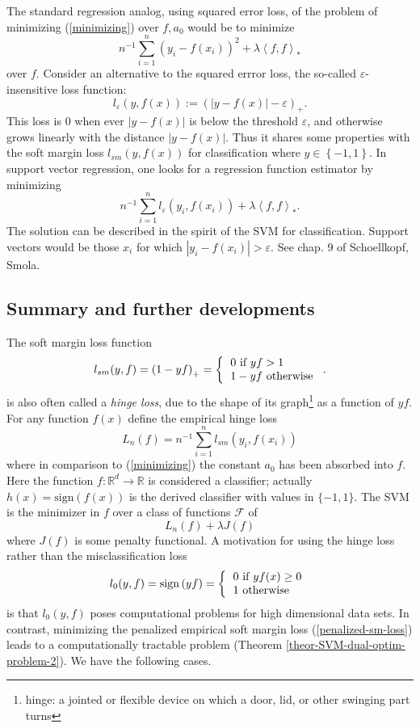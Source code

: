 \documentclass[11pt,twoside]{article}%
\theoremstyle{change}
\begin{document}
The standard regression analog, using squared error loss, of the problem of
minimizing (\ref{minimizing}) over $f,a_{0}$ would be to minimize%
\[
n^{-1}\sum_{i=1}^{n}(y_{i}-f(x_{i}))^{2}+\lambda\left\langle f,f\right\rangle
_{\ast}%
\]
over $f$. Consider an alternative to the squared errror loss, the so-called
$\varepsilon$-insensitive loss function:
\[
l_{\varepsilon}\left(  y,f(x)\right)  :=\left(  \left\vert y-f(x)\right\vert
-\varepsilon\right)  _{+}.
\]
This loss is $0$ when ever $\left\vert y-f(x)\right\vert $ is below the
threshold $\varepsilon$, and otherwise grows linearly with the distance
$\left\vert y-f(x)\right\vert .$ Thus it shares some properties with the soft
margin loss $l_{sm}(y,f(x))$ for classification where $y\in\left\{
-1,1\right\}  $. In support vector regression, one looks for a regression
function estimator by minimizing%
\[
n^{-1}\sum_{i=1}^{n}l_{\varepsilon}\left(  y_{i},f(x_{i})\right)
+\lambda\left\langle f,f\right\rangle _{\ast}.
\]
The solution can be described in the spirit of the SVM for classification.
Support vectors would be those $x_{i}$ for which $\left\vert y_{i}%
-f(x_{i})\right\vert >\varepsilon$. See chap. 9 of Schoellkopf, Smola.

\subsection{Summary and further developments}

The soft margin loss function
\[
l_{sm}(y,f)=\left(  1-yf\right)  _{+}=\left\{
\begin{tabular}
[c]{l}%
$0$ if $yf>1$\\
$1-yf$ otherwise
\end{tabular}
\right.  .
\]
is also often called a \textit{hinge loss}, due to the shape of its
graph\footnote{hinge: a jointed or flexible device on which a door, lid, or
other swinging part turns} as a function of $yf$. For any function $f(x)$
define the empirical hinge loss
\[
L_{n}(f)=n^{-1}\sum_{i=1}^{n}l_{sm}(y_{i},f(x_{i}))
\]
where in comparison to (\ref{minimizing}) the constant $a_{0}$ has been
absorbed into $f$. Here the function $f:\mathbb{R}^{d}\rightarrow\mathbb{R}$
is considered a classifier; actually $h(x)=\mathrm{sign}\left(  f(x)\right)  $
is the derived classifier with values in $\{-1,1\}$. The SVM is the minimizer
in $f$ over a class of functions $\mathcal{F}$ of
\begin{equation}
L_{n}(f)+\lambda J(f)\label{penalized-sm-loss}%
\end{equation}
where $J(f)$ is some penalty functional. A motivation for using the hinge loss
rather than the misclassification loss
\[
l_{0}(y,f)=\mathrm{sign}\left(  yf\right)  =\left\{
\begin{tabular}
[c]{l}%
$0$ if $yf(x)\geq0$\\
$1$ otherwise
\end{tabular}
\right.
\]
is that $l_{0}(y,f)$ poses computational problems for high dimensional data
sets. In contrast, minimizing the penalized empirical soft margin loss
(\ref{penalized-sm-loss}) leads to a computationally tractable problem
(Theorem \ref{theor-SVM-dual-optim-problem-2}). We have the following cases.
\end{document}

